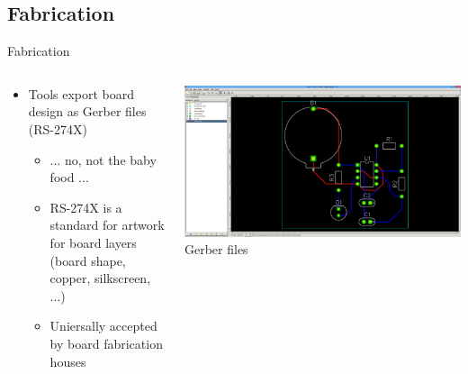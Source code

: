 \documentclass{beamer}
\begin{document}
\subsection{Fabrication}
\begin{frame}{Fabrication}
  \begin{columns}[T]
    \begin{column}{.6\textwidth}
      \begin{itemize}
        \item Tools export board design as Gerber files (RS-274X)
        \begin{itemize}
          \item ... no, not the baby food ...
          \item RS-274X is a standard for artwork for board layers (board shape, copper, silkscreen, ...)
          \item Uniersally accepted by board fabrication houses
        \end{itemize}
      \end{itemize}
    \end{column}

    \begin{column}{0.4\textwidth} \centering
      \includegraphics[width=0.9\columnwidth]{../images/diptrace/555_gerbv} \\
      Gerber files
    \end{column}
  \end{columns}
\end{frame}
\end{document}
